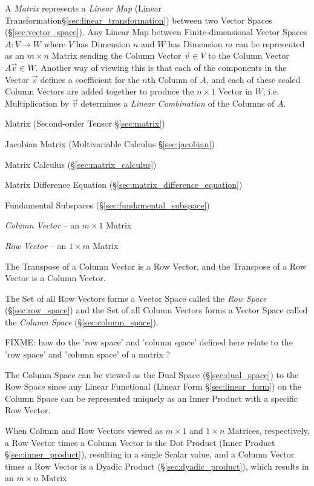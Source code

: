 A \emph{Matrix} represents a \emph{Linear Map} (Linear
Transformation\S\ref{sec:linear_transformation}) between two Vector Spaces
(\S\ref{sec:vector_space}). Any Linear Map between Finite-dimensional Vector
Spaces $A : V \rightarrow W$ where $V$ has Dimension $n$ and $W$ has Dimension
$m$ can be represented as an $m \times n$ Matrix sending the Column Vector
$\vec{v} \in V$ to the Column Vector $A\vec{v} \in W$. Another way of viewing
this is that each of the components in the Vector $\vec{v}$ defines a
coefficient for the $n$th Column of $A$, and each of these scaled Column
Vectors are added together to produce the $n \times 1$ Vector in $W$, i.e.
Multiplication by $\vec{v}$ determines a \emph{Linear Combination} of the
Columns of $A$.

\fist Matrix (Second-order Tensor \S\ref{sec:matrix})

\fist Jacobian Matrix (Multivariable Calculus \S\ref{sec:jacobian})

\fist Matrix Calculus (\S\ref{sec:matrix_calculus})

\fist Matrix Difference Equation (\S\ref{sec:matrix_difference_equation})

\fist Fundamental Subspaces (\S\ref{sec:fundamental_subspace})

\emph{Column Vector} -- an $m \times 1$ Matrix

\emph{Row Vector} -- an $1 \times m$ Matrix

The Transpose of a Column Vector is a Row Vector, and the Transpose of a Row
Vector is a Column Vector.

The Set of all Row Vectors forms a Vector Space called the \emph{Row Space}
(\S\ref{sec:row_space}) and the Set of all Column Vectors forms a Vector Space
called the \emph{Column Space} (\S\ref{sec:column_space}).

FIXME: how do the 'row space' and 'column space' defined here relate to the
'row space' and 'column space' of a matrix ?

The Column Space can be viewed as the Dual Space (\S\ref{sec:dual_space}) to
the Row Space since any Linear Functional (Linear Form \S\ref{sec:linear_form})
on the Column Space can be represented uniquely as an Inner Product with a
specific Row Vector.

When Column and Row Vectors viewed as $m \times 1$ and $1 \times n$ Matrices,
respectively, a Row Vector times a Column Vector is the Dot Product
(Inner Product \S\ref{sec:inner_product}), resulting in a single Scalar value,
and a Column Vector times a Row Vector is a Dyadic Product
(\S\ref{sec:dyadic_product}), which results in an $m \times n$ Matrix


